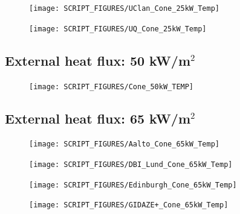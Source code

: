 \documentclass{book}
\begin{document}
\begin{landscape}
\begin{minipage}{0.65\textwidth}
\begin{figure}[H]
{\texttt{[image: SCRIPT\_FIGURES/UClan\_Cone\_25kW\_Temp]}}\\
\end{figure}
\end{minipage}
\begin{minipage}{0.35\textwidth}
\begin{figure}[H]
{\texttt{[image: SCRIPT\_FIGURES/UQ\_Cone\_25kW\_Temp]}}\\
\end{figure}
\end{minipage}
\vfill

\newpage
\subsection{External heat flux: 50 kW/m$^2$}
\begin{minipage}{0.65\textwidth}
\begin{figure}[H]
{\texttt{[image: SCRIPT\_FIGURES/Cone\_50kW\_TEMP]}}\\
\end{figure}
\end{minipage}
\vfill

\newpage
\subsection{External heat flux: 65 kW/m$^2$}
\begin{minipage}{0.65\textwidth}
\begin{figure}[H]
{\texttt{[image: SCRIPT\_FIGURES/Aalto\_Cone\_65kW\_Temp]}}\\
\end{figure}
\end{minipage}
\begin{minipage}{0.35\textwidth}
\begin{figure}[H]
{\texttt{[image: SCRIPT\_FIGURES/DBI\_Lund\_Cone\_65kW\_Temp]}}\\
\end{figure}
\end{minipage}

\begin{minipage}{0.65\textwidth}
\begin{figure}[H]
{\texttt{[image: SCRIPT\_FIGURES/Edinburgh\_Cone\_65kW\_Temp]}}\\
\end{figure}
\end{minipage}
\begin{minipage}{0.35\textwidth}
\begin{figure}[H]
{\texttt{[image: SCRIPT\_FIGURES/GIDAZE+\_Cone\_65kW\_Temp]}}\\
\end{figure}
\end{minipage}


\end{landscape}
\end{document}
